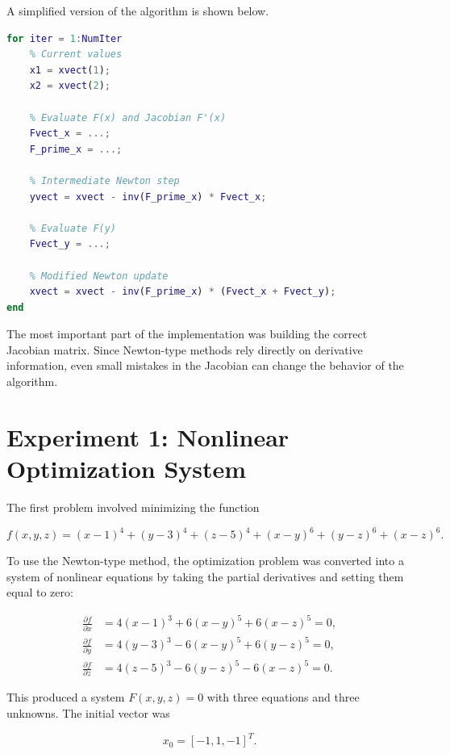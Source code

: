 \documentclass[11pt]{article}
\begin{document}
A simplified version of the algorithm is shown below.

\begin{lstlisting}[language=Matlab, caption={Simplified MATLAB structure for the third-order Newton-type method}]
for iter = 1:NumIter
    % Current values
    x1 = xvect(1);
    x2 = xvect(2);

    % Evaluate F(x) and Jacobian F'(x)
    Fvect_x = ...;
    F_prime_x = ...;

    % Intermediate Newton step
    yvect = xvect - inv(F_prime_x) * Fvect_x;

    % Evaluate F(y)
    Fvect_y = ...;

    % Modified Newton update
    xvect = xvect - inv(F_prime_x) * (Fvect_x + Fvect_y);
end
\end{lstlisting}

The most important part of the implementation was building the correct Jacobian matrix. Since Newton-type methods rely directly on derivative information, even small mistakes in the Jacobian can change the behavior of the algorithm.

\section{Experiment 1: Nonlinear Optimization System}

The first problem involved minimizing the function

\begin{equation}
    f(x,y,z) = (x-1)^4 + (y-3)^4 + (z-5)^4 + (x-y)^6 + (y-z)^6 + (x-z)^6.
\end{equation}

To use the Newton-type method, the optimization problem was converted into a system of nonlinear equations by taking the partial derivatives and setting them equal to zero:

\begin{align}
    \frac{\partial f}{\partial x} &= 4(x-1)^3 + 6(x-y)^5 + 6(x-z)^5 = 0, \\
    \frac{\partial f}{\partial y} &= 4(y-3)^3 - 6(x-y)^5 + 6(y-z)^5 = 0, \\
    \frac{\partial f}{\partial z} &= 4(z-5)^3 - 6(y-z)^5 - 6(x-z)^5 = 0.
\end{align}

This produced a system $F(x,y,z)=0$ with three equations and three unknowns. The initial vector was

\begin{equation}
    x_0 = [-1, 1, -1]^T.
\end{equation}
\end{document}
